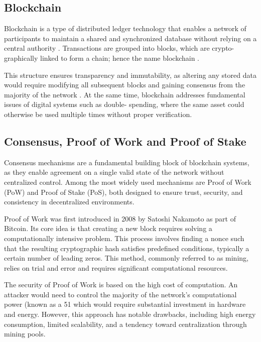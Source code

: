 \documentclass[conference]{IEEEtran}
\begin{document}
\subsection{Blockchain}

Blockchain is a type of distributed ledger technology that
enables a network of participants to maintain a shared and
synchronized database without relying on a central authority
\cite{nakamoto2008bitcoin, indjcst-fundamentals}. Transactions are grouped into blocks, which are crypto-
graphically linked to form a chain; hence the name blockchain
\cite{indjcst-fundamentals}.

This structure ensures transparency and immutability,
as altering any stored data would require modifying all
subsequent blocks and gaining consensus from the majority
of the network \cite{nakamoto2008bitcoin}. At the same time, blockchain addresses
fundamental issues of digital systems such as double-
spending, where the same asset could otherwise be used
multiple times without proper verification.

\subsection{Consensus, Proof of Work and Proof of Stake}

Consensus mechanisms are a fundamental building block of
blockchain systems, as they enable agreement on a single valid
state of the network without centralized control. Among the
most widely used mechanisms are Proof of Work (PoW) and
Proof of Stake (PoS), both designed to ensure trust, security,
and consistency in decentralized environments.

Proof of Work was first introduced in 2008 by Satoshi
Nakamoto as part of Bitcoin. Its core idea is that creating
a new block requires solving a computationally intensive
problem. This process involves finding a nonce such that the
resulting cryptographic hash satisfies predefined conditions,
typically a certain number of leading zeros. This method,
commonly referred to as mining, relies on trial and error and
requires significant computational resources.

The security of Proof of Work is based on the high cost of
computation. An attacker would need to control the majority
of the network’s computational power (known as a 51%
which would require substantial investment in hardware
and energy. However, this approach has notable drawbacks,
including high energy consumption, limited scalability, and a
tendency toward centralization through mining pools.
\end{document}
